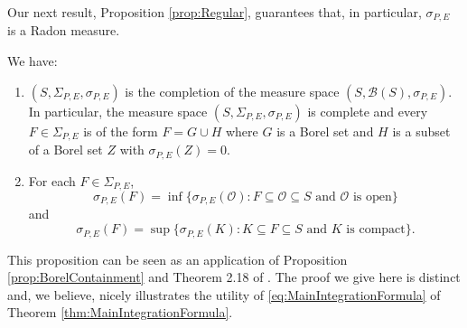 \documentclass[smallextended]{svjour3}
\theoremstyle{remark}
\begin{document}
\noindent Our next result, Proposition \ref{prop:Regular}, guarantees that, in particular, $\sigma_{P,E}$ is a Radon measure. 

\begin{proposition}\label{prop:Regular}
We have:
\begin{enumerate}
    \item\label{item:Complete} $(S,\Sigma_{P,E},\sigma_{P,E})$ is the completion of the measure space $(S,\mathcal{B}(S),\sigma_{P,E})$. In particular, the measure space $(S,\Sigma_{P,E},\sigma_{P,E})$ is complete and every $F\in \Sigma_{P,E}$ is of the form $F=G\cup H$ where $G$ is a Borel set and $H$ is a subset of a Borel set $Z$ with $\sigma_{P,E}(Z)=0$.
\item\label{item:Regular} For each $F\in\Sigma_{P,E}$,
\begin{equation}\label{eq:OuterRegular}
\sigma_{P,E}(F)=\inf\{\sigma_{P,E}(\mathcal{O}):F\subseteq\mathcal{O}\subseteq S\mbox{ and $\mathcal{O}$ is open}\}
\end{equation}
and
\begin{equation}
\sigma_{P,E}(F)=\sup\{\sigma_{P,E}(K):K\subseteq F\subseteq S\mbox{ and $K$ is compact}\}.
\end{equation}
\end{enumerate} 
\end{proposition}
\begin{remark}
This proposition can be seen as an application of Proposition \ref{prop:BorelContainment} and Theorem 2.18 of \cite{rudin_real_1987}. The proof we give here is distinct and, we believe, nicely illustrates the utility of \eqref{eq:MainIntegrationFormula} of Theorem \ref{thm:MainIntegrationFormula}.
\end{remark}
\end{document}
